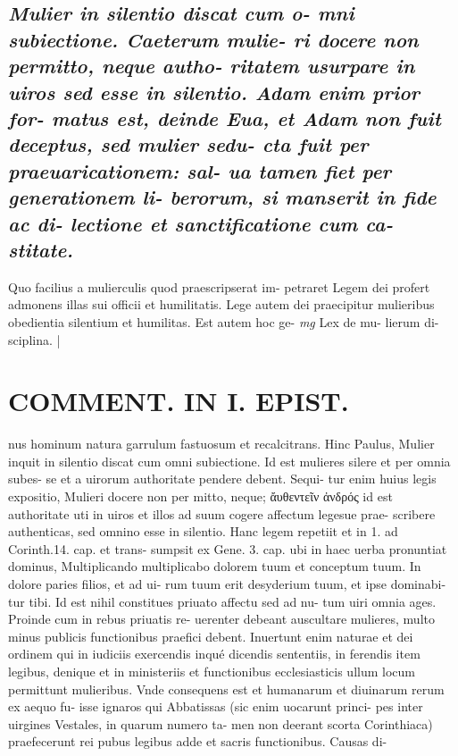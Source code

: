 \documentclass{article}
\begin{document}
\begin{pages}
\subsection*{\textit{Mulier in silentio discat cum o- mni subiectione. Caeterum mulie- ri docere non permitto, neque autho- ritatem usurpare in uiros sed esse in silentio. Adam enim prior for- matus est, deinde Eua, et Adam non fuit deceptus, sed mulier sedu- cta fuit per praeuaricationem: sal- ua tamen fiet per generationem li- berorum, si manserit in fide ac di- lectione et sanctificatione cum ca- stitate. }}\pstart Quo facilius a mulierculis quod praescripserat im- petraret Legem dei profert admonens illas sui officii et humilitatis. Lege autem dei praecipitur mulieribus obedientia silentium et humilitas. Est autem hoc ge-  \pend
\textit{mg}
\footnotesize Lex de mu- lierum di- sciplina. 
\normalsize| 
\section*{COMMENT. IN I. EPIST. }\pstart nus hominum natura garrulum fastuosum et recalcitrans. Hinc Paulus, Mulier inquit in silentio discat cum omni subiectione. Id est mulieres silere et per omnia subes- se et a uirorum authoritate pendere debent. Sequi- tur enim huius legis expositio, Mulieri docere non per mitto, neque; ἄυθεντεῖν ἀνδρός id est authoritate uti in uiros et illos ad suum cogere affectum legesue prae- scribere authenticas, sed omnino esse in silentio. Hanc legem repetiit et in 1. ad Corinth.14. cap. et trans- sumpsit ex Gene. 3. cap. ubi in haec uerba pronuntiat dominus, Multiplicando multiplicabo dolorem tuum et conceptum tuum. In dolore paries filios, et ad ui- rum tuum erit desyderium tuum, et ipse dominabi- tur tibi. Id est nihil constitues priuato affectu sed ad nu- tum uiri omnia ages. Proinde cum in rebus priuatis re- uerenter debeant auscultare mulieres, multo minus publicis functionibus praefici debent. Inuertunt enim naturae et dei ordinem qui in iudiciis exercendis inqué dicendis sententiis, in ferendis item legibus, denique et in ministeriis et functionibus ecclesiasticis ullum locum permittunt mulieribus. Vnde consequens est et humanarum et diuinarum rerum ex aequo fu- isse ignaros qui Abbatissas (sic enim uocarunt princi- pes inter uirgines Vestales, in quarum numero ta- men non deerant scorta Corinthiaca) praefecerunt rei pubus  legibus adde et sacris functionibus. Causas di-  \pend

\end{pages}
\end{document}
